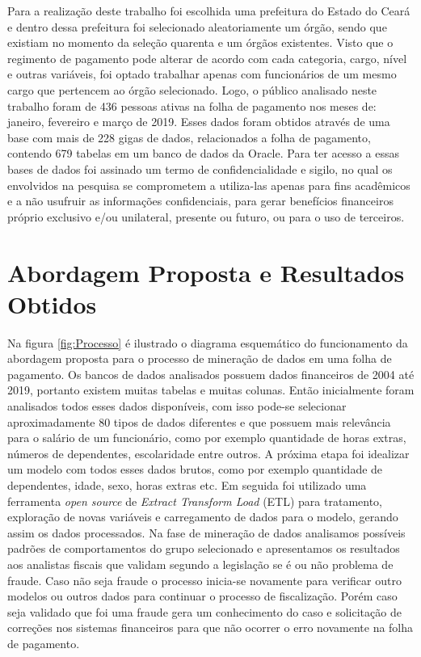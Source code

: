\documentclass[12pt]{article}
\begin{document}
Para a realização deste trabalho foi escolhida uma prefeitura do Estado do Ceará e dentro dessa prefeitura foi selecionado aleatoriamente um órgão, sendo que existiam no momento da seleção quarenta e um órgãos existentes. Visto que o regimento de pagamento pode alterar de acordo com cada categoria, cargo, nível e outras variáveis, foi optado trabalhar apenas com funcionários de um mesmo cargo que pertencem ao órgão selecionado. Logo, o público analisado neste trabalho foram de 436 pessoas ativas na folha de pagamento nos meses de: janeiro, fevereiro e março de 2019. Esses dados foram obtidos através de uma base com mais de 228 gigas de dados, relacionados a folha de pagamento, contendo 679 tabelas em um banco de dados da Oracle. Para ter acesso a essas bases de dados foi assinado um termo de confidencialidade e sigilo, no qual os envolvidos na pesquisa se comprometem a utiliza-las apenas para fins acadêmicos e a não usufruir as informações confidenciais, para gerar benefícios financeiros próprio exclusivo e/ou unilateral, presente ou futuro, ou para o uso de terceiros.

\section{Abordagem Proposta e Resultados Obtidos}
Na figura \ref{fig:Processo} é ilustrado o diagrama esquemático do funcionamento da abordagem proposta para o processo de mineração de dados em uma folha de pagamento. Os bancos de dados analisados possuem dados financeiros de 2004 até 2019, portanto existem muitas tabelas e muitas colunas. Então inicialmente foram analisados todos esses dados disponíveis, com isso pode-se selecionar aproximadamente 80 tipos de dados diferentes e que possuem mais relevância para o salário de um funcionário, como por exemplo quantidade de horas extras, números de dependentes, escolaridade entre outros. A próxima etapa foi idealizar um modelo com todos esses dados brutos, como por exemplo quantidade de dependentes, idade, sexo, horas extras etc. Em seguida foi utilizado uma ferramenta \textit{open source} de \textit{Extract Transform Load} (ETL) para tratamento, exploração de novas variáveis e carregamento de dados para o modelo, gerando assim os dados processados. Na fase de mineração de dados analisamos possíveis padrões de comportamentos do grupo selecionado e apresentamos os resultados aos analistas fiscais que validam segundo a legislação se é ou não problema de fraude. Caso não seja fraude o processo inicia-se novamente para verificar outro modelos ou outros dados para continuar o processo de fiscalização. Porém caso seja validado que foi uma fraude gera um conhecimento do caso e solicitação de correções nos sistemas financeiros para que não ocorrer o erro novamente na folha de pagamento. 
\end{document}

